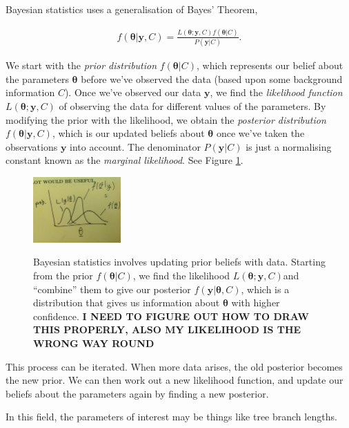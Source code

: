 \documentclass[12pt]{article}
\begin{document}
Bayesian statistics uses a generalisation of Bayes' Theorem,

\begin{eqnarray}
  f(\bm{\theta}|\bm{y},C) = \frac{L(\bm{\theta};\bm{y},C)f(\bm{\theta}|C)}{P(\bm{y}|C)}.\label{BayesTheoremGen}
\end{eqnarray}

We start with the \emph{prior distribution} $f(\bm{\theta}|C)$, which represents our belief about the parameters $\bm{\theta}$ before we've observed the data (based upon some background information $C$). Once we've observed our data $\bm{y}$, we find the \emph{likelihood function} $L(\bm{\theta};\bm{y},C)$ of observing the data for different values of the parameters. By modifying the prior with the likelihood, we obtain the \emph{posterior distribution} $f(\bm{\theta}|\bm{y},C)$, which is our updated beliefs about $\bm{\theta}$ once we've taken the observations $\bm{y}$ into account. The denominator $P(\bm{y}|C)$ is just a normalising constant known as the \emph{marginal likelihood}. See Figure \ref{Triplot}.

\begin{figure}[h!]
  \centering
  	\includegraphics[width=0.3\textwidth]{figures/Triplot}\\[1.5cm]
        \caption{Bayesian statistics involves updating prior beliefs with data. Starting from the prior $f(\bm{\theta}|C)$, we find the likelihood $L(\bm{\theta};\bm{y},C)$and ``combine'' them to give our posterior $f(\bm{y}|\bm{\theta},C)$, which is a distribution that gives us information about $\bm{\theta}$ with higher confidence. \textbf{I NEED TO FIGURE OUT HOW TO DRAW THIS PROPERLY, ALSO MY LIKELIHOOD IS THE WRONG WAY ROUND}} \label{Triplot}
\end{figure}


This process can be iterated. When more data arises, the old posterior becomes the new prior. We can then work out a new likelihood function, and update our beliefs about the parameters again by finding a new posterior.

In this field, the parameters of interest may be things like tree branch lengths.
\end{document}
